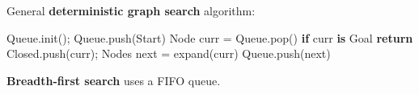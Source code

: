 \documentclass[landscape]{article}
\newcommand{\vmspace}{\vspace{-7pt}}
\newcommand{\vamspace}{\vspace{-3pt}}
\newcommand{\vpspace}{\vspace{5pt}}
\begin{document}
\begin{multicols}{3}
\vmspace


\begin{minipage}{\columnwidth}
  General \textbf{deterministic graph search} algorithm:

  \vamspace

  \begin{algorithm}[H]
    Queue.init();
    Queue.push(Start)\;
    {
      Node curr = Queue.pop()\;
      \textbf{if} curr \textbf{is} Goal \textbf{return}\;
      Closed.push(curr);
      Nodes next = expand(curr)\;
      {
        Queue.push(next)\;
      }
    }
  \end{algorithm}
\end{minipage}

\vpspace

\begin{minipage}{\columnwidth}
  \textbf{Breadth-first search} uses a FIFO queue.
\end{minipage}





\end{multicols}
\end{document}
